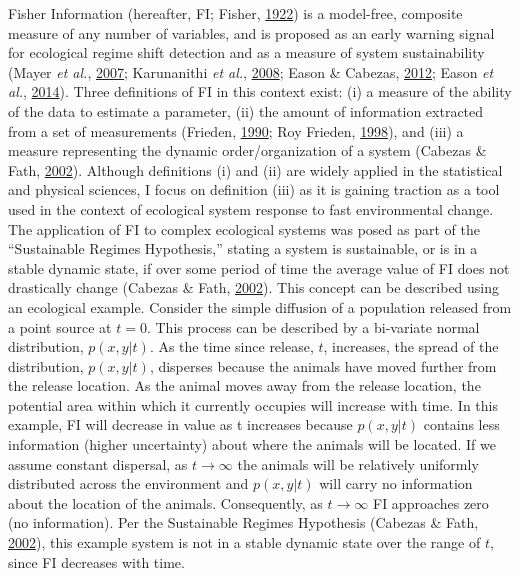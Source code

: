 \documentclass[12pt,twoside,openany]{reedthesis}
\begin{document}
Fisher Information (hereafter, FI; Fisher, \protect\hyperlink{ref-fisher_mathematical_1922}{1922}) is a model-free, composite measure of any number of variables, and is proposed as an early warning signal for ecological regime shift detection and as a measure of system sustainability (Mayer \emph{et al.}, \protect\hyperlink{ref-mayer_applications_2007}{2007}; Karunanithi \emph{et al.}, \protect\hyperlink{ref-karunanithi_detection_2008}{2008}; Eason \& Cabezas, \protect\hyperlink{ref-eason_evaluating_2012}{2012}; Eason \emph{et al.}, \protect\hyperlink{ref-eason2014managing}{2014}). Three definitions of FI in this context exist: (i) a measure of the ability of the data to estimate a parameter, (ii) the amount of information extracted from a set of measurements (Frieden, \protect\hyperlink{ref-frieden_fisher_1990}{1990}; Roy Frieden, \protect\hyperlink{ref-frieden_physics_1998}{1998}), and (iii) a measure representing the dynamic order/organization of a system (Cabezas \& Fath, \protect\hyperlink{ref-cabezas_towards_2002}{2002}). Although definitions (i) and (ii) are widely applied in the statistical and physical sciences, I focus on definition (iii) as it is gaining traction as a tool used in the context of ecological system response to fast environmental change. The application of FI to complex ecological systems was posed as part of the ``Sustainable Regimes Hypothesis,'' stating a system is sustainable, or is in a stable dynamic state, if over some period of time the average value of FI does not drastically change (Cabezas \& Fath, \protect\hyperlink{ref-cabezas_towards_2002}{2002}). This concept can be described using an ecological example. Consider the simple diffusion of a population released from a point source at \(t=0\). This process can be described by a bi-variate normal distribution, \(p(x,y|t)\). As the time since release, \(t\), increases, the spread of the distribution, \(p(x,y|t)\), disperses because the animals have moved further from the release location. As the animal moves away from the release location, the potential area within which it currently occupies will increase with time. In this example, FI will decrease in value as t increases because \(p(x,y|t)\) contains less information (higher uncertainty) about where the animals will be located. If we assume constant dispersal, as \(t\rightarrow\infty\) the animals will be relatively uniformly distributed across the environment and \(p(x,y|t)\) will carry no information about the location of the animals. Consequently, as \(t\rightarrow\infty\) FI approaches zero (no information). Per the Sustainable Regimes Hypothesis (Cabezas \& Fath, \protect\hyperlink{ref-cabezas_towards_2002}{2002}), this example system is not in a stable dynamic state over the range of \(t\), since FI decreases with time.
\end{document}
